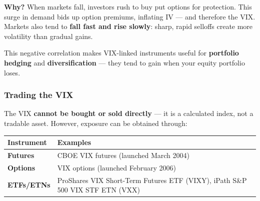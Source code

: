 \documentclass[12pt,openany]{book}
\begin{document}
\begin{center}
\end{center}


\textbf{Why?} When markets fall, investors rush to buy put options for protection. This surge in demand bids up option premiums, inflating IV — and therefore the VIX. Markets also tend to \textbf{fall fast and rise slowly}: sharp, rapid selloffs create more volatility than gradual gains.

This negative correlation makes VIX-linked instruments useful for \textbf{portfolio hedging} and \textbf{diversification} — they tend to gain when your equity portfolio loses.

\subsubsection{Trading the VIX}

The VIX \textbf{cannot be bought or sold directly} — it is a calculated index, not a tradable asset. However, exposure can be obtained through:

\begin{center}
\scriptsize
\setlength{\tabcolsep}{3pt}
\begin{tabular}{|L{6.3cm}|L{6.3cm}|}
\hline
\textbf{Instrument} & \textbf{Examples} \\
\hline
\textbf{Futures} & CBOE VIX futures (launched March 2004) \\
\hline
\textbf{Options} & VIX options (launched February 2006) \\
\hline
\textbf{ETFs/ETNs} & ProShares VIX Short-Term Futures ETF (VIXY), iPath S\&P 500 VIX STF ETN (VXX) \\
\hline
\end{tabular}
\end{center}
\end{document}
